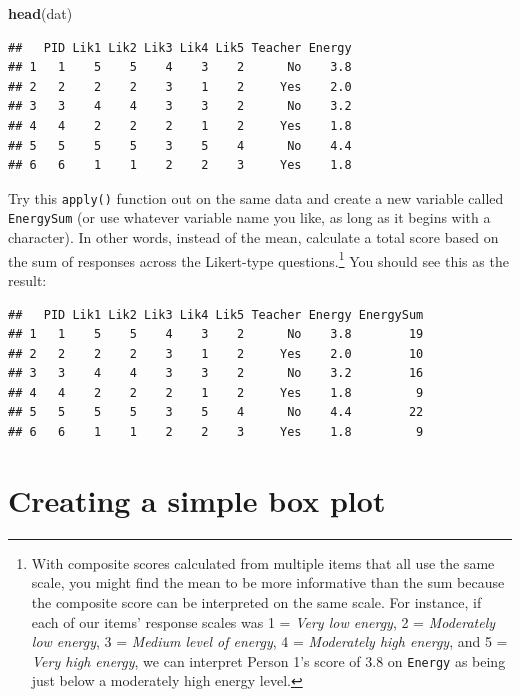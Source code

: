 \documentclass[
]{book}
\newenvironment{Shaded}{\begin{snugshade}}{\end{snugshade}}
\newcommand{\KeywordTok}[1]{\textcolor[rgb]{0.13,0.29,0.53}{\textbf{#1}}}
\newcommand{\NormalTok}[1]{#1}
\begin{document}
\begin{Shaded}
\begin{Highlighting}[]
\KeywordTok{head}\NormalTok{(dat)}
\end{Highlighting}
\end{Shaded}

\begin{verbatim}
##   PID Lik1 Lik2 Lik3 Lik4 Lik5 Teacher Energy
## 1   1    5    5    4    3    2      No    3.8
## 2   2    2    2    3    1    2     Yes    2.0
## 3   3    4    4    3    3    2      No    3.2
## 4   4    2    2    2    1    2     Yes    1.8
## 5   5    5    5    3    5    4      No    4.4
## 6   6    1    1    2    2    3     Yes    1.8
\end{verbatim}

Try this \texttt{apply()} function out on the same data and create a new variable called \texttt{EnergySum} (or use whatever variable name you like, as long as it begins with a character). In other words, instead of the mean, calculate a total score based on the sum of responses across the Likert-type questions.\footnote{With composite scores calculated from multiple items that all use the same scale, you might find the mean to be more informative than the sum because the composite score can be interpreted on the same scale.
  For instance, if each of our items' response scales was 1 = \emph{Very low energy}, 2 = \emph{Moderately low energy}, 3 = \emph{Medium level of energy}, 4 = \emph{Moderately high energy}, and 5 = \emph{Very high energy}, we can interpret Person 1's score of 3.8 on \texttt{Energy} as being just below a moderately high energy level.} You should see this as the result:

\begin{verbatim}
##   PID Lik1 Lik2 Lik3 Lik4 Lik5 Teacher Energy EnergySum
## 1   1    5    5    4    3    2      No    3.8        19
## 2   2    2    2    3    1    2     Yes    2.0        10
## 3   3    4    4    3    3    2      No    3.2        16
## 4   4    2    2    2    1    2     Yes    1.8         9
## 5   5    5    5    3    5    4      No    4.4        22
## 6   6    1    1    2    2    3     Yes    1.8         9
\end{verbatim}

\hypertarget{plotting}{%
\chapter{Creating a simple box plot}\label{plotting}}
\end{document}
